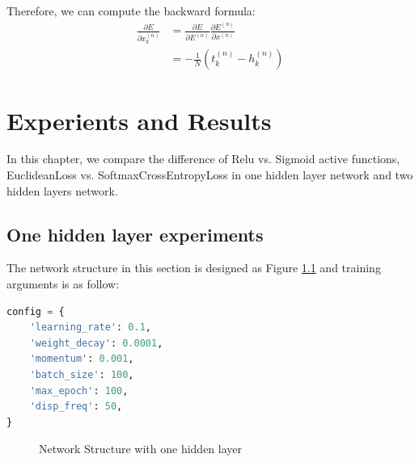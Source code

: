 \documentclass{elegantbook}
\begin{document}
Therefore, we can compute the backward formula:
\begin{equation}
\begin{aligned}
\frac{\partial E}{\partial x_k^{(n)}}&=\frac{\partial E}{\partial E^{(n)}}\frac{\partial E^{(n)}}{\partial x^{(n)}} \\
&=-\frac{1}{N}(t_k^{(n)}-h_k^{(n)})
\end{aligned}
\end{equation}

\chapter{Experients and Results}

In this chapter, we compare the difference of Relu vs. Sigmoid active functions, EuclideanLoss vs. SoftmaxCrossEntropyLoss in one hidden layer network and two hidden layers network.

\section{One hidden layer experiments}
The network structure in this section is designed as Figure \ref{fig1} and training arguments is as follow:

\begin{lstlisting}[frame=single,language=python]  
config = {
	'learning_rate': 0.1,
	'weight_decay': 0.0001,
	'momentum': 0.001,
	'batch_size': 100,
	'max_epoch': 100,
	'disp_freq': 50,
}
\end{lstlisting}

\begin{figure}[htbp]
	\centering
	\caption{\label{fig1}Network Structure with one hidden layer}
\end{figure}
\end{document}
